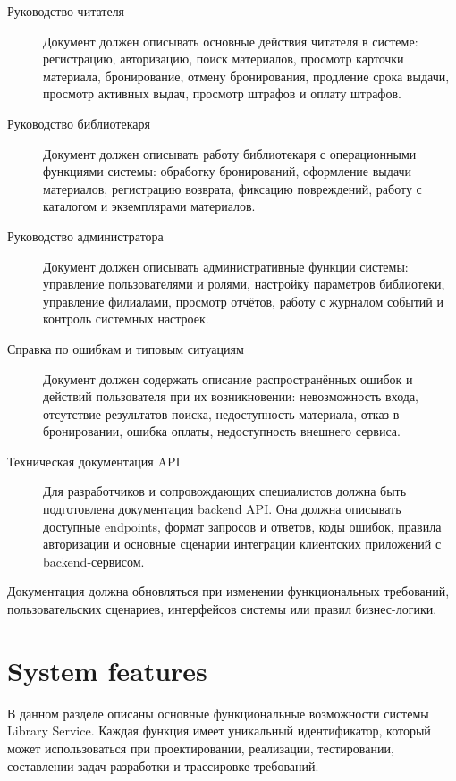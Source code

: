 \documentclass[12pt,a4paper]{article}
\begin{document}
	\begin{description}
		\item[Руководство читателя]
		Документ должен описывать основные действия читателя в системе: регистрацию,
		авторизацию, поиск материалов, просмотр карточки материала, бронирование,
		отмену бронирования, продление срока выдачи, просмотр активных выдач,
		просмотр штрафов и оплату штрафов.
		
		\item[Руководство библиотекаря]
		Документ должен описывать работу библиотекаря с операционными функциями
		системы: обработку бронирований, оформление выдачи материалов, регистрацию
		возврата, фиксацию повреждений, работу с каталогом и экземплярами материалов.
		
		\item[Руководство администратора]
		Документ должен описывать административные функции системы: управление
		пользователями и ролями, настройку параметров библиотеки, управление филиалами,
		просмотр отчётов, работу с журналом событий и контроль системных настроек.
		
		\item[Справка по ошибкам и типовым ситуациям]
		Документ должен содержать описание распространённых ошибок и действий
		пользователя при их возникновении: невозможность входа, отсутствие результатов
		поиска, недоступность материала, отказ в бронировании, ошибка оплаты,
		недоступность внешнего сервиса.
		
		\item[Техническая документация API]
		Для разработчиков и сопровождающих специалистов должна быть подготовлена
		документация backend API. Она должна описывать доступные endpoints, формат
		запросов и ответов, коды ошибок, правила авторизации и основные сценарии
		интеграции клиентских приложений с backend-сервисом.
	\end{description}
	
	Документация должна обновляться при изменении функциональных требований,
	пользовательских сценариев, интерфейсов системы или правил бизнес-логики.
	\newpage
	
	\section{System features}
	
	В данном разделе описаны основные функциональные возможности системы Library
	Service. Каждая функция имеет уникальный идентификатор, который может
	использоваться при проектировании, реализации, тестировании, составлении задач
	разработки и трассировке требований.
	
\end{document}
